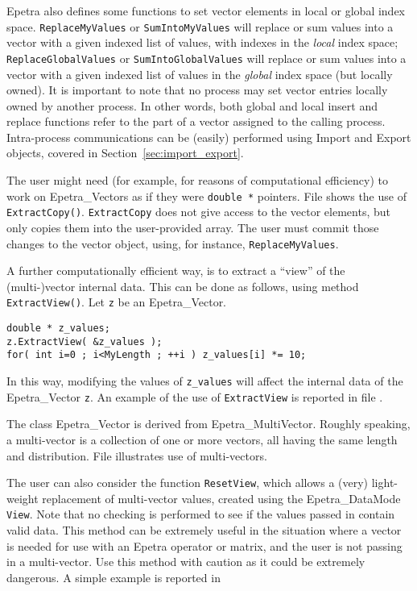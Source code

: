 Epetra also defines some functions to set vector elements in local or
global index space.  \verb!ReplaceMyValues! or \verb!SumIntoMyValues!
will replace or sum values into a vector with a given indexed list of
values, with indexes in the {\em local} index space;
\verb!ReplaceGlobalValues! or \newline
\verb!SumIntoGlobalValues! will replace or
sum values into a vector with a given indexed list of values in the {\em
  global} index space (but locally owned). It is important to note that
no process may set vector entries locally owned by another process. In
other words, both global and local insert and replace functions refer to
the part of a vector assigned to the calling process. Intra-process
communications can be (easily) performed using Import and Export
objects, covered in Section~\ref{sec:import_export}.

The user might need (for example, for reasons of computational
efficiency) to work on Epetra\_Vectors as if they were \verb!double *!
pointers.  File \newline {} \newline shows the use
of \verb!ExtractCopy()!.  \verb!ExtractCopy! does not give access to the
vector elements, but only copies them into the user-provided array.  The
user must commit those changes to the vector object, using, for
instance, \verb!ReplaceMyValues!.

A further computationally efficient way, is to extract a ``view'' of the
(multi-)vector internal data.  This can be done as follows, using method
\verb!ExtractView()!. Let \verb!z! be an Epetra\_Vector. 
\begin{verbatim}
double * z_values;
z.ExtractView( &z_values );
for( int i=0 ; i<MyLength ; ++i ) z_values[i] *= 10;
\end{verbatim}
In this way, modifying the values of \verb!z_values! will affect the
internal data of the Epetra\_Vector \verb!z!.  An example of the use of
\verb!ExtractView! is reported in file \newline {}.

\begin{remark}
  The class Epetra\_Vector is derived from Epetra\_MultiVector. Roughly
  speaking, a multi-vector is a collection of one or more vectors, all
  having the same length and distribution.  File 
  illustrates use of multi-vectors.
\end{remark}

The user can also consider the function \verb!ResetView!, which allows a
(very) light-weight replacement of multi-vector values, created using
the Epetra\_DataMode \verb!View!. Note that no checking is performed to
see if the values passed in contain valid data. This method can be
extremely useful in the situation where a vector is needed for use with
an Epetra operator or matrix, and the user is not passing in a
multi-vector. Use this method with caution as it could be extremely
dangerous.  A simple example is reported in \newline
{}

